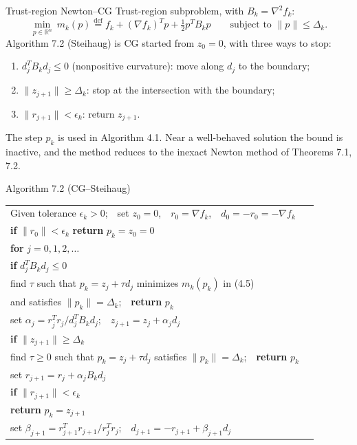 \documentclass[aspectratio=169,12pt]{beamer}
\makeatletter
\newcommand{\R}{\mathbb{R}}
\newcommand{\gradf}{\nabla f}
\newcommand{\hessf}{\nabla^{2} f}
\newcommand{\algostretch}{1.12}
\newenvironment{algo}{\par\renewcommand{\arraystretch}{\algostretch}%
  \begin{tabular}{@{}l@{\hspace{2.2em}}l@{}}}{\end{tabular}\par}
\makeatother
\begin{document}
\begin{frame}{Trust-region Newton--CG}
  Trust-region subproblem, with $B_{k}=\hessf_{k}$:
  \[
    \min_{p\in\R^{n}}\ m_{k}(p)\overset{\text{def}}{=}f_{k}+(\gradf_{k})^{T}p+\tfrac12p^{T}B_{k}p
    \qquad\text{subject to }\|p\|\le\Delta_{k} .
    \tag{7.11}
  \]
  Algorithm 7.2 (Steihaug) is CG started from $z_{0}=0$, with three ways to stop:
  \begin{enumerate}\setlength\itemsep{0.3em}
    \item $d_{j}^{T}B_{k}d_{j}\le 0$ (nonpositive curvature): move along $d_{j}$ to the boundary;
    \item $\|z_{j+1}\|\ge\Delta_{k}$: stop at the intersection with the boundary;
    \item $\|r_{j+1}\|<\epsilon_{k}$: return $z_{j+1}$.
  \end{enumerate}

  \vspace{0.3em}
  The step $p_{k}$ is used in Algorithm 4.1. Near a well-behaved solution the bound is
  inactive, and the method reduces to the inexact Newton method of Theorems 7.1, 7.2.
\end{frame}

\begin{frame}{Algorithm 7.2 (CG--Steihaug)}
  \renewcommand{\algostretch}{1.0}%
  \begin{block}{}\small
    \begin{algo}
      Given tolerance $\epsilon_{k}>0$;\ \ set $z_{0}=0$,\ \ $r_{0}=\gradf_{k}$,\ \ $d_{0}=-r_{0}=-\gradf_{k}$ & \\
      \textbf{if} $\|r_{0}\|<\epsilon_{k}$ \textbf{return} $p_{k}=z_{0}=0$ & \\
      \textbf{for} $j=0,1,2,\dots$ & \\
      \quad \textbf{if} $d_{j}^{T}B_{k}d_{j}\le 0$ & \\
      \qquad find $\tau$ such that $p_{k}=z_{j}+\tau d_{j}$ minimizes $m_{k}(p_{k})$ in (4.5) & \\
      \qquad and satisfies $\|p_{k}\|=\Delta_{k}$;\ \ \textbf{return} $p_{k}$ & \\
      \quad set $\alpha_{j}=r_{j}^{T}r_{j}/d_{j}^{T}B_{k}d_{j}$;\ \ $z_{j+1}=z_{j}+\alpha_{j}d_{j}$ & \\
      \quad \textbf{if} $\|z_{j+1}\|\ge\Delta_{k}$ & \\
      \qquad find $\tau\ge 0$ such that $p_{k}=z_{j}+\tau d_{j}$ satisfies $\|p_{k}\|=\Delta_{k}$;\ \
             \textbf{return} $p_{k}$ & \\
      \quad set $r_{j+1}=r_{j}+\alpha_{j}B_{k}d_{j}$ & \\
      \quad \textbf{if} $\|r_{j+1}\|<\epsilon_{k}$ & \\
      \qquad \textbf{return} $p_{k}=z_{j+1}$ & \\
      \quad set $\beta_{j+1}=r_{j+1}^{T}r_{j+1}/r_{j}^{T}r_{j}$;\ \ $d_{j+1}=-r_{j+1}+\beta_{j+1}d_{j}$ & \\
    \end{algo}
  \end{block}
\end{frame}
\end{document}
